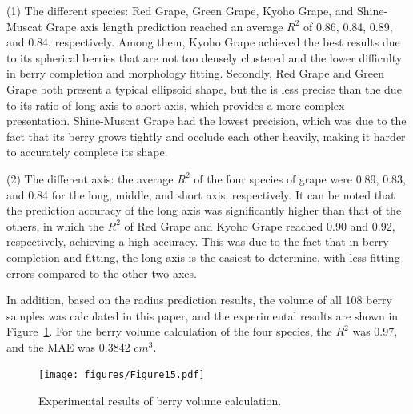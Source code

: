 \documentclass[12pt]{article}
\begin{document}
(1) The different species: Red Grape, Green Grape, Kyoho Grape, and Shine-Muscat Grape axis length prediction reached an average $R^2$ of 0.86, 0.84, 0.89, and 0.84, respectively. 
Among them, Kyoho Grape achieved the best results due to its spherical berries that are not too densely clustered and the lower difficulty in berry completion and morphology fitting. 
Secondly, Red Grape and Green Grape both present a typical ellipsoid shape, but the  is less precise than the  due to its  ratio of long axis to short axis, which provides a more complex presentation. 
Shine-Muscat Grape had the lowest precision, which was due to the fact that its berry grows tightly and occlude each other heavily, making it harder to accurately complete its shape.

(2) The different axis: the average $R^2$ of the four species of grape were 0.89, 0.83, and 0.84 for the long, middle, and short axis, respectively. 
It can be noted that the prediction accuracy of the long axis was significantly higher than that of the others, in which the $R^2$ of Red Grape and Kyoho Grape reached 0.90 and 0.92, respectively, achieving a high accuracy. 
This was due to the fact that in berry completion and fitting, the long axis is the easiest to determine, with less fitting errors compared to the other two axes.

In addition, based on the radius prediction results, the volume of all 108 berry samples was calculated in this paper, and the experimental results are shown in Figure~\ref{fig:raw18}.
For the berry volume calculation of the four species, the $R^2$ was 0.97, and the MAE was 0.3842 $cm^3$.

\begin{figure}[hbt!]
    \centering
    \texttt{[image: figures/Figure15.pdf]}
    \caption{Experimental results of berry volume calculation. }
    \label{fig:raw18}
\end{figure}
\end{document}
